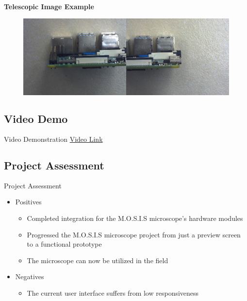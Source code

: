 \documentclass[17pt, aspectratio=169]{beamer}
\begin{document}
\begin{frame}
	\textbf{Telescopic Image Example}
	\begin{figure}
		\includegraphics[width=\textwidth, height=\textheight, keepaspectratio]{./Figures/focusStack-S.jpg}
	\end{figure}
\end{frame}
\subsection{Video Demo}
\begin{frame}{Video Demonstration}
	\href{https://youtu.be/vZ3BhtEMVA0}{Video Link}
\end{frame}
\subsection{Project Assessment}
\begin{frame}{Project Assessment}
	\begin{itemize}
		\item Positives
		      \begin{itemize}
			      \item Completed integration for the M.O.S.I.S microscope's hardware modules
			      \item Progressed the M.O.S.I.S microscope project from just a preview screen to a functional prototype
			      \item The microscope can now be utilized in the field
		      \end{itemize}
		\item Negatives
		      \begin{itemize}
			      \item The current user interface suffers from low responsiveness
		      \end{itemize}
	\end{itemize}
\end{frame}
\end{document}
